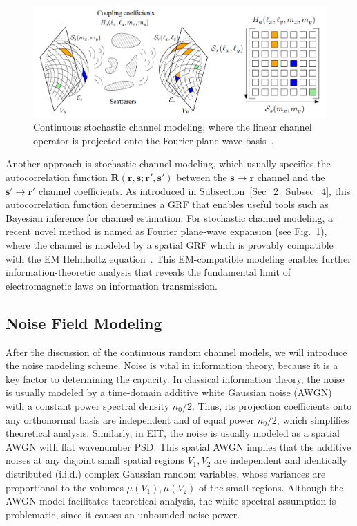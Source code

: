 \documentclass[journal,twocolumn]{IEEEtran}
\begin{document}
\begin{figure}
	\centering 
	\includegraphics[width=\linewidth]{figures/random_channel-new.png} 
	\caption{Continuous stochastic channel modeling, where the linear channel operator is projected onto the Fourier plane-wave basis~\cite{marzetta2022fourier}.} 
	\label{fig:marzetta}
\end{figure}
Another approach is stochastic channel modeling, which usually specifies the autocorrelation function ${\bm R}({\bm r}, {\bm s}; {\bm r}', {\bm s'})$ between the ${\bm s}\to {\bm r}$ channel and the ${\bm s}'\to{\bm r}'$ channel coefficients. As introduced in Subsection~\ref{Sec_2_Subsec_4}, this autocorrelation function determines a GRF that enables useful tools such as Bayesian inference for channel estimation. 
For stochastic channel modeling, a recent novel method is named as Fourier plane-wave expansion (see Fig.~\ref{fig:marzetta}), where the channel is modeled by a spatial GRF which is provably compatible with the EM Helmholtz equation~\cite{marzetta2022fourier}. This EM-compatible modeling enables further information-theoretic analysis that reveals the fundamental limit of electromagnetic laws on information transmission. 

\vspace{-3mm}
\subsection{Noise Field Modeling}
After the discussion of the continuous random channel models, we will introduce the noise modeling scheme. 
Noise is vital in information theory, because it is a key factor to determining the capacity. 
In classical information theory, the noise is usually modeled by a time-domain additive white Gaussian noise (AWGN) with a constant power spectral density $n_0/2$. Thus, its projection coefficients onto any orthonormal basis are independent and of equal power $n_0/2$, which simplifies theoretical analysis. 
Similarly, in EIT, the noise is usually modeled as a spatial AWGN with flat wavenumber PSD. This spatial AWGN implies that the additive noises at any disjoint small spatial regions $V_1, V_2$ are independent and identically distributed (i.i.d.) complex Gaussian random variables, whose variances are proportional to the volumes $\mu(V_1), \mu(V_2)$ of the small regions. Although the AWGN model facilitates theoretical analysis, the white spectral assumption is problematic, since it causes an unbounded noise power. 
\end{document}
